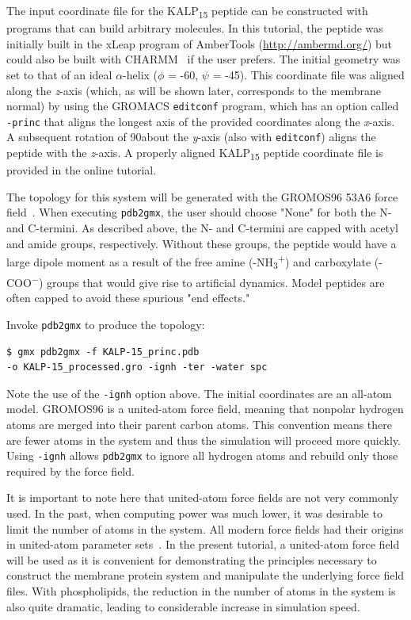 \documentclass[9pt,tutorial]{livecoms}
\begin{document}
The input coordinate file for the KALP\textsubscript{15} peptide can be constructed with programs that can build arbitrary molecules. In this tutorial, the peptide was initially built in the xLeap program of AmberTools (\url{http://ambermd.org/}) but could also be built with CHARMM~\cite{Brooks2009} if the user prefers. The initial geometry was set to that of an ideal $\alpha$-helix ($\phi$ = -60\textdegree, $\psi$ = -45\textdegree). This coordinate file was aligned along the {\em z}-axis (which, as will be shown later, corresponds to the membrane normal) by using the GROMACS \texttt{editconf} program, which has an option called \texttt{-princ} that aligns the longest axis of the provided coordinates along the {\em x}-axis. A subsequent rotation of 90\textdegree about the {\em y}-axis (also with \texttt{editconf}) aligns the peptide with the {\em z}-axis. A properly aligned KALP\textsubscript{15} peptide coordinate file is provided in the online tutorial.

The topology for this system will be generated with the GROMOS96 53A6 force field~\cite{Oostenbrink2004}. When executing \texttt{pdb2gmx}, the user should choose "None" for both the N- and C-termini. As described above, the N- and C-termini are capped with acetyl and amide groups, respectively. Without these groups, the peptide would have a large dipole moment as a result of the free amine (-NH\textsubscript{3}\textsuperscript{+}) and carboxylate (-COO\textsuperscript{$-$}) groups that would give rise to artificial dynamics. Model peptides are often capped to avoid these spurious "end effects."

Invoke \texttt{pdb2gmx} to produce the topology:

\begin{verbatim}
$ gmx pdb2gmx -f KALP-15_princ.pdb 
-o KALP-15_processed.gro -ignh -ter -water spc
\end{verbatim}

Note the use of the \texttt{-ignh} option above. The initial coordinates are an all-atom model. GROMOS96 is a united-atom force field, meaning that nonpolar hydrogen atoms are merged into their parent carbon atoms. This convention means there are fewer atoms in the system and thus the simulation will proceed more quickly. Using \texttt{-ignh} allows \texttt{pdb2gmx} to ignore all hydrogen atoms and rebuild only those required by the force field.

It is important to note here that united-atom force fields are not very commonly used. In the past, when computing power was much lower, it was desirable to limit the number of atoms in the system. All modern force fields had their origins in united-atom parameter sets~\cite{Gelin1979,Weiner1984,Jorgensen1984b}. In the present tutorial, a united-atom force field will be used as it is convenient for demonstrating the principles necessary to construct the membrane protein system and manipulate the underlying force field files. With phospholipids, the reduction in the number of atoms in the system is also quite dramatic, leading to considerable increase in simulation speed.
\end{document}
